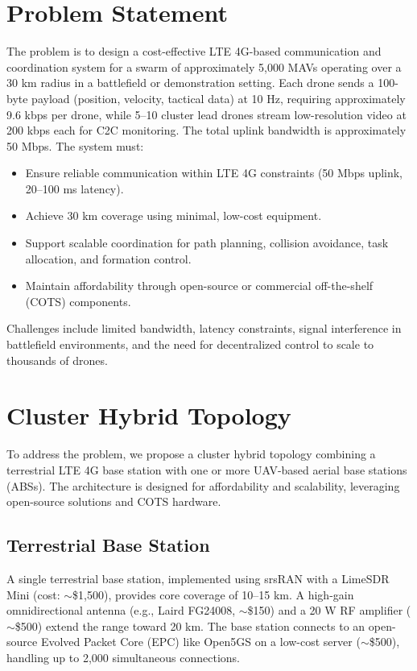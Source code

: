 \documentclass{article}
\begin{document}
\section{Problem Statement}
The problem is to design a cost-effective LTE 4G-based communication and coordination system for a swarm of approximately 5,000 MAVs operating over a 30 km radius in a battlefield or demonstration setting. Each drone sends a 100-byte payload (position, velocity, tactical data) at 10 Hz, requiring approximately 9.6 kbps per drone, while 5--10 cluster lead drones stream low-resolution video at 200 kbps each for C2C monitoring. The total uplink bandwidth is approximately 50 Mbps. The system must:
\begin{itemize}
    \item Ensure reliable communication within LTE 4G constraints (50 Mbps uplink, 20--100 ms latency).
    \item Achieve 30 km coverage using minimal, low-cost equipment.
    \item Support scalable coordination for path planning, collision avoidance, task allocation, and formation control.
    \item Maintain affordability through open-source or commercial off-the-shelf (COTS) components.
\end{itemize}
Challenges include limited bandwidth, latency constraints, signal interference in battlefield environments, and the need for decentralized control to scale to thousands of drones.

\section{Cluster Hybrid Topology}
To address the problem, we propose a cluster hybrid topology combining a terrestrial LTE 4G base station with one or more UAV-based aerial base stations (ABSs). The architecture is designed for affordability and scalability, leveraging open-source solutions and COTS hardware.

\subsection{Terrestrial Base Station}
A single terrestrial base station, implemented using srsRAN with a LimeSDR Mini (cost: $\sim$\$1,500), provides core coverage of 10--15 km. A high-gain omnidirectional antenna (e.g., Laird FG24008, $\sim$\$150) and a 20 W RF amplifier ($\sim$\$500) extend the range toward 20 km. The base station connects to an open-source Evolved Packet Core (EPC) like Open5GS on a low-cost server ($\sim$\$500), handling up to 2,000 simultaneous connections.
\end{document}
